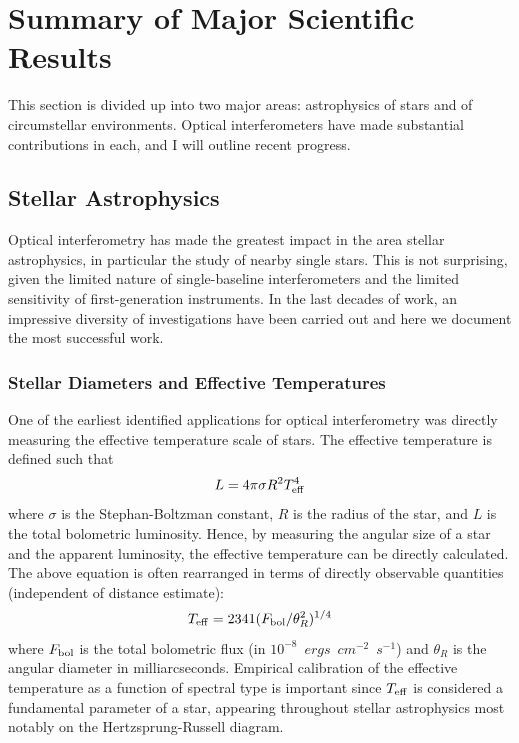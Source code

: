 \documentclass[12pt]{iopart}
\begin{document}
\section{Summary of Major Scientific Results}


This section is divided up into two major areas: astrophysics of stars
and of circumstellar environments.  Optical interferometers have made
substantial contributions in each, and I will 
outline recent progress.


\subsection{Stellar Astrophysics}
Optical interferometry has made the greatest impact in the area
stellar astrophysics, in particular the study of nearby single stars.  
This is not surprising, given the limited nature of
single-baseline interferometers and the limited sensitivity of
first-generation instruments.   In the last decades of work, an impressive
diversity of investigations have been carried out and here we document
the most successful work.   

\subsubsection{Stellar Diameters and Effective Temperatures}

One of the earliest identified applications for optical interferometry
was directly measuring the effective temperature scale of stars.  
The effective temperature is defined such that
\begin{equation}
L = 4 \pi \sigma R^2 T^4_{\rm eff}
\end{equation}
where $\sigma$ is the Stephan-Boltzman constant, $R$ is the radius of
the star, and $L$ is the total bolometric luminosity.  Hence, by
measuring the angular size of a star and the apparent luminosity, the
effective temperature can be directly calculated.   The above equation 
is often rearranged in terms of directly observable quantities (independent
of distance estimate):
\begin{equation}
T_{\rm eff} = 2341 (F_{\rm bol}/\theta^2_R)^{1/4}
\end{equation}
where $F_{\rm bol}$ is the
total bolometric flux (in $10^{-8}$~$ergs$~$cm^{-2}$~$s^{-1}$)
and $\theta_R$ is the angular diameter in milliarcseconds.  Empirical 
calibration of the effective temperature as a function of spectral type
is important
since $T_{\rm eff}$ is considered a fundamental parameter
of a star, appearing throughout stellar astrophysics most notably on the
Hertzsprung-Russell diagram.
\end{document}
